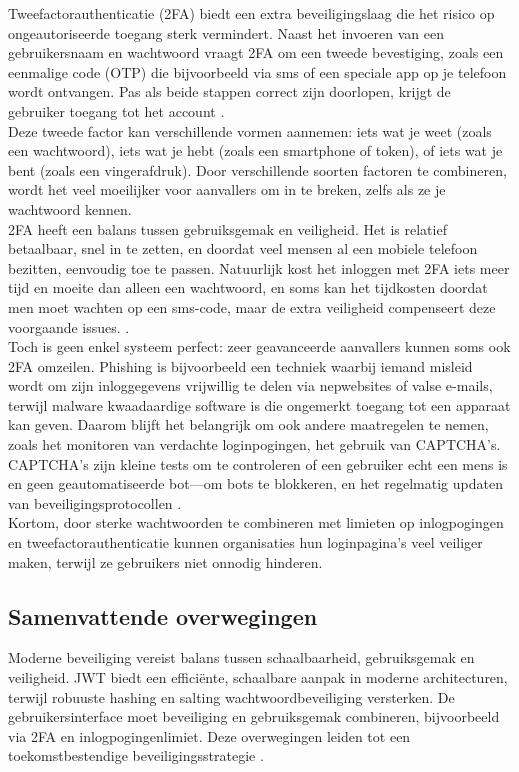 Tweefactorauthenticatie (2FA) biedt een extra beveiligingslaag die het risico op ongeautoriseerde toegang sterk vermindert. Naast het invoeren van een gebruikersnaam en wachtwoord vraagt 2FA om een tweede bevestiging, zoals een eenmalige code (OTP) die bijvoorbeeld via sms of een speciale app op je telefoon wordt ontvangen. Pas als beide stappen correct zijn doorlopen, krijgt de gebruiker toegang tot het account \autocite{Florczak2023}.\\

Deze tweede factor kan verschillende vormen aannemen: iets wat je weet (zoals een wachtwoord), iets wat je hebt (zoals een smartphone of token), of iets wat je bent (zoals een vingerafdruk). Door verschillende soorten factoren te combineren, wordt het veel moeilijker voor aanvallers om in te breken, zelfs als ze je wachtwoord kennen.\\

2FA heeft een balans tussen gebruiksgemak en veiligheid. Het is relatief betaalbaar, snel in te zetten, en doordat veel mensen al een mobiele telefoon bezitten, eenvoudig toe te passen. Natuurlijk kost het inloggen met 2FA iets meer tijd en moeite dan alleen een wachtwoord, en soms kan het tijdkosten doordat men moet wachten op een sms-code, maar de extra veiligheid compenseert deze voorgaande issues. \autocite{Florczak2023}.\\

Toch is geen enkel systeem perfect: zeer geavanceerde aanvallers kunnen soms ook 2FA omzeilen. Phishing is bijvoorbeeld een techniek waarbij iemand misleid wordt om zijn inloggegevens vrijwillig te delen via nepwebsites of valse e-mails, terwijl malware kwaadaardige software is die ongemerkt toegang tot een apparaat kan geven. Daarom blijft het belangrijk om ook andere maatregelen te nemen, zoals het monitoren van verdachte loginpogingen, het gebruik van CAPTCHA’s. CAPTCHA's zijn kleine tests om te controleren of een gebruiker echt een mens is en geen geautomatiseerde bot—om bots te blokkeren, en het regelmatig updaten van beveiligingsprotocollen \autocite{SanderVinberg2021}.\\

Kortom, door sterke wachtwoorden te combineren met limieten op inlogpogingen en tweefactorauthenticatie kunnen organisaties hun loginpagina’s veel veiliger maken, terwijl ze gebruikers niet onnodig hinderen.\\

\subsection{Samenvattende overwegingen}
Moderne beveiliging vereist balans tussen schaalbaarheid, gebruiksgemak en veiligheid. JWT biedt een efficiënte, schaalbare aanpak in moderne architecturen, terwijl robuuste hashing en salting wachtwoordbeveiliging versterken. De gebruikersinterface moet beveiliging en gebruiksgemak combineren, bijvoorbeeld via 2FA en inlogpogingenlimiet. Deze overwegingen leiden tot een toekomstbestendige beveiligingsstrategie \autocite{Balaj2017, Sriramya2015, Long2019, SanderVinberg2021, Florczak2023}.

